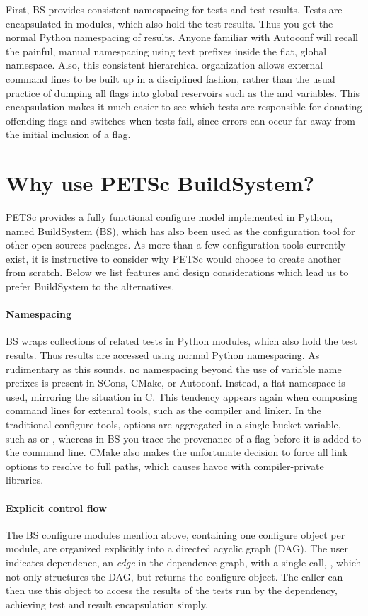{{{First, BS provides consistent namespacing for tests and test results. Tests are encapsulated in modules, which also hold
the test results. Thus you get the normal Python namespacing of results. Anyone familiar with Autoconf will recall the
painful, manual namespacing using text prefixes inside the flat, global namespace. Also, this consistent hierarchical
organization allows external command lines to be built up in a disciplined fashion, rather than the usual practice of
dumping all flags into global reservoirs such as the  and  variables. This
encapsulation makes it much easier to see which tests are responsible for donating offending flags and switches when
tests fail, since errors can occur far away from the initial inclusion of a flag.

\section{Why use PETSc BuildSystem?}

PETSc provides a fully functional configure model implemented in Python, named BuildSystem (BS), which has also been
used as the configuration tool for other open sources packages. As more than a few configuration tools currently exist,
it is instructive to consider why PETSc would choose to create another from scratch. Below we list features and design
considerations which lead us to prefer BuildSystem to the alternatives.

\paragraph{Namespacing} BS wraps collections of related tests in Python modules, which also hold the test results. Thus
results are accessed using normal Python namespacing. As rudimentary as this sounds, no namespacing beyond the use of
variable name prefixes is present in SCons, CMake, or Autoconf. Instead, a flat namespace is used, mirroring the
situation in C. This tendency appears again when composing command lines for extenral tools, such as the compiler and
linker. In the traditional configure tools, options are aggregated in a single bucket variable, such as
 or , whereas in BS you trace the provenance of a flag before it is added to the
command line. CMake also makes the unfortunate decision to force all link options to resolve to full paths, which causes
havoc with compiler-private libraries.

\paragraph{Explicit control flow} The BS configure modules mention above, containing one configure object per module,
are organized explicitly into a directed acyclic graph (DAG). The user indicates dependence, an \textit{edge} in the
dependence graph, with a single call, , which not only structures the
DAG, but returns the configure object. The caller can then use this object to access the results of the tests run by the
dependency, achieving test and result encapsulation simply.

}}}
